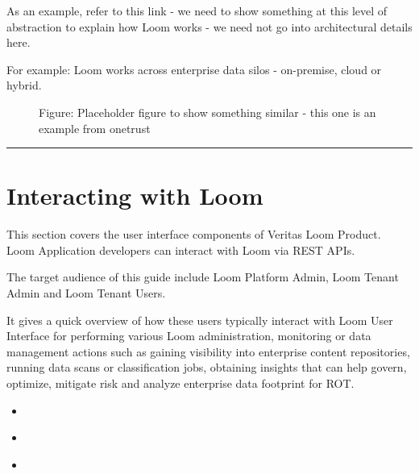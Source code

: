 \documentclass[letterpaper,10pt,english]{sphinxmanual}
\begin{document}
As an example, refer to this link - we need to show something at this level of abstraction to explain how Loom works - we need not go into architectural details here. 

For example: Loom works across enterprise data silos - on-premise, cloud or hybrid.

\begin{figure}[htbp]
\centering
\capstart

\noindent{}
\caption{Figure: Placeholder figure to show something similar - this one is an example from onetrust}\label{\detokenize{loom_getting_started_guide:id14}}\end{figure}


\bigskip\hrule\bigskip



\chapter{Interacting with Loom}
\label{\detokenize{loom_getting_started_guide:gsg-interacting-mcdmp}}\label{\detokenize{loom_getting_started_guide:interacting-with-loom}}
This section covers the user interface components of Veritas Loom Product. Loom Application developers can interact with Loom via REST APIs.

The target audience of this guide include Loom Platform Admin, Loom Tenant Admin and Loom Tenant Users.

It gives a quick overview of how these users typically interact with Loom User Interface for performing various Loom administration, monitoring or data management actions such as gaining visibility into enterprise content repositories, running data scans or classification jobs, obtaining insights that can help govern, optimize, mitigate risk and analyze enterprise data footprint for ROT.

\begin{sphinxShadowBox}
\begin{itemize}
\item {} 
\label{\detokenize{loom_getting_started_guide:id72}}{\hyperref[\detokenize{loom_getting_started_guide:loom-ui}]{}}

\item {} 
\label{\detokenize{loom_getting_started_guide:id73}}{\hyperref[\detokenize{loom_getting_started_guide:loom-dashboard}]{}}

\item {} 
\label{\detokenize{loom_getting_started_guide:id74}}{\hyperref[\detokenize{loom_getting_started_guide:loom-workflows}]{}}

\end{itemize}
\end{sphinxShadowBox}
\end{document}
